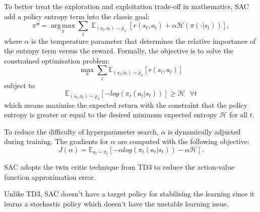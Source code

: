 {To better treat the exploration and exploitation trade-off in mathematics, SAC add a policy entropy term into the classic goal:
\begin{displaymath}
\pi\mbox{*} = \operatorname*{\mathrm{arg\,max}}_\pi \sum_t \mathop{\mathbb{E}}_{(s_t,a_t)\sim\rho_\pi}\left[r(s_t,a_t)+\alpha\mathcal{H}(\pi(\cdot|s_t))\right],
\end{displaymath}
where $\alpha$ is the temperature parameter that determines the relative importance of the entropy term versus the reward. Formally, the objective is to solve the constrained optimisation problem:
\begin{displaymath}
\max_{\pi} \sum_{t} \mathbb{E}_{(s_t, a_t) \sim \rho_\pi} \left[ r(s_t,a_t) \right]
\end{displaymath}
subject to
\begin{displaymath}
\mathbb{E}_{(s_t, a_t) \sim \rho_\pi} \left[ -log(\pi_t(a_t|s_t)) \right] \ge \mathcal{H} \text{   } \forall t
\end{displaymath}
which means maximise the expected return with the constraint that the policy entropy is greater or equal to the desired minimum expected entropy $\mathcal{H}$ for all $t$.

To reduce the difficulty of hyperparameter search, $\alpha$ is dynamically adjusted during training. The gradients for $\alpha$ are computed with the following objective:
\begin{displaymath}
J(\alpha) = \mathbb{E}_{a_t \sim \pi_t} \left[ - \alpha log(\pi_t(a_t|s_t)) - \alpha \mathcal{H} \right].
\end{displaymath}

SAC adopts the twin critic technique from TD3 to reduce the action-value function approximation error.

Unlike TD3, SAC doesn't have a target policy for stabilising the learning since it learns a stochastic policy which doesn't have the unstable learning issue.

}
